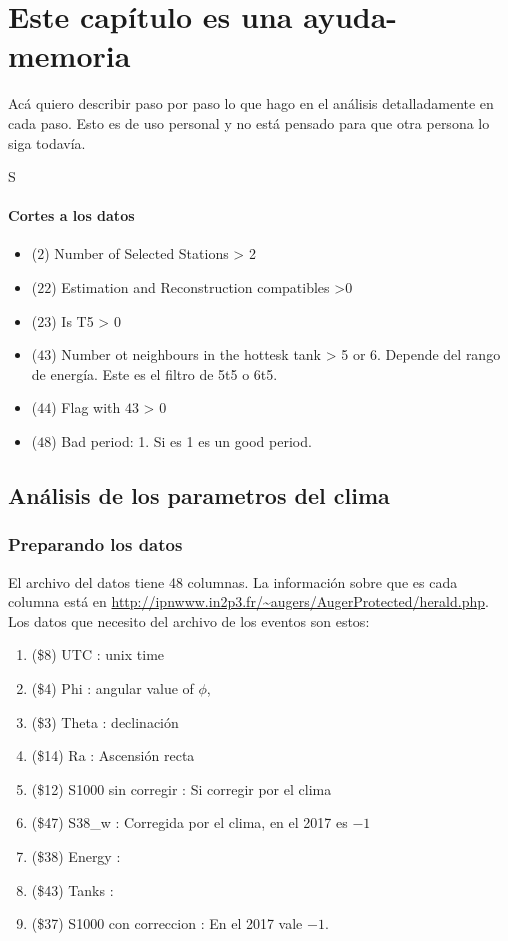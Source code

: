 \chapter{Este capítulo es una ayuda-memoria}


Acá quiero describir paso por paso lo que hago en el análisis detalladamente en cada paso. Esto es de uso personal y no está pensado para que otra persona lo siga todavía.

	S\subsubsection{Cortes a los datos}
		\begin{itemize}
			\item ($2$) Number of Selected Stations > 2
			\item ($22$) Estimation and Reconstruction compatibles >0
			\item ($23$) Is T5 > 0
			\item ($43$) Number ot neighbours in the hottesk tank > 5 or 6. Depende del rango de energía. Este es el filtro de 5t5 o 6t5.
			\item ($44$) Flag with $43$ > 0
			\item ($48$) Bad period: 1. Si es 1 es un good period.
 		\end{itemize}

\section{Análisis de los parametros del  clima}

\subsection{Preparando los datos}
	 El archivo del datos tiene 48 columnas. La información sobre que es cada columna está en \url{http://ipnwww.in2p3.fr/~augers/AugerProtected/herald.php}.   Los datos que necesito del archivo de los eventos son estos:
			\begin{enumerate}
				\item (\$8)   UTC                  	: unix time 
				\item (\$4)   Phi                  	: angular value of $\phi$, 
				\item (\$3)   Theta                	: declinación
				\item (\$14)  Ra                   	: Ascensión recta
				\item (\$12)  S1000 sin corregir   	: Si corregir por el clima
				\item (\$47)  S38\_w                : Corregida por el clima, en el 2017 es $-1$
				\item (\$38)  Energy         		:
				\item (\$43)  Tanks                	: 
				\item (\$37)  S1000 con correccion 	: En el 2017 vale $-1$.
			\end{enumerate}

